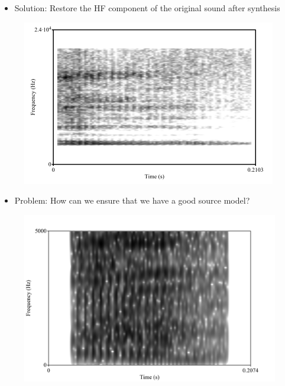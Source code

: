 \documentclass{beamer}
\begin{document}
\begin{frame}
\begin{itemize}
\item{Solution: Restore the HF component of the original sound after synthesis}
\end{itemize}
\begin{figure}
\includegraphics[scale=0.5,keepaspectratio]{synth_HF_added.png}
\end{figure}
\end{frame}
\begin{frame}
\begin{itemize}
\item{Problem: How can we ensure that we have a good source model?}
\end{itemize}
\begin{figure}
\includegraphics[scale=0.5,keepaspectratio]{not_very_white.png}
\end{figure}
\end{frame}
\end{document}
